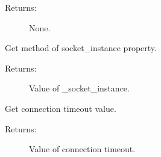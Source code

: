 \documentclass[letterpaper,10pt,english]{sphinxmanual}
\begin{document}
\begin{fulllineitems}
\begin{fulllineitems}
\begin{description}
\item[{Returns:}] \leavevmode
\sphinxAtStartPar
None.

\end{description}

\end{fulllineitems}


\begin{fulllineitems}
\label{\detokenize{QConnectionLibrary:QConnectionLibrary.tcp.tcp_base.TCPBase.socket_instance}}
\sphinxAtStartPar
Get method of socket\_instance property.
\begin{description}
\item[{Returns:}] \leavevmode
\sphinxAtStartPar
Value of \_socket\_instance.

\end{description}

\end{fulllineitems}


\begin{fulllineitems}
\label{\detokenize{QConnectionLibrary:QConnectionLibrary.tcp.tcp_base.TCPBase.timeout}}
\sphinxAtStartPar
Get connection timeout value.
\begin{description}
\item[{Returns:}] \leavevmode
\sphinxAtStartPar
Value of connection timeout.

\end{description}

\end{fulllineitems}


\end{fulllineitems}

\end{document}
